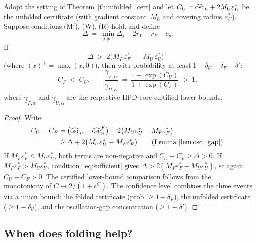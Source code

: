 \begin{theorem}\label{thm:gap_improvement}
  Adopt the setting of Theorem~\ref{thm:folded_cert} and let
  $C_U = \widehat{\mathrm{osc}}_n + 2 M_U \varepsilon_U^*$ be the unfolded
  certificate (with gradient constant~$M_U$ and covering
  radius~$\varepsilon_U^*$).
  Suppose conditions \textup{(M$'$)}, \textup{(W)}, \textup{(R)}
  hold, and define
  \[
    \Delta
    \;=\;
    \min_{j \neq 1}\Delta_j - 2r_1 - r_F - c_n.
  \]
  If
  \begin{equation}\label{eq:sufficient}
    \Delta
    \;>\;
    2\bigl(M_F\,\varepsilon_F^*
    \;-\; M_U\,\varepsilon_U^*\bigr)^{\!+}
  \end{equation}
  (where $(x)^+ = \max(x,0)$), then with probability at least
  $1 - \delta_U - \delta_F - \delta'$:
  \begin{equation}\label{eq:C_comparison}
    C_F \;<\; C_U,
    \qquad
    \frac{\underline{\gamma}_{F,\alpha}}{\underline{\gamma}_{U,\alpha}}
    \;=\;
    \frac{1 + \exp(C_U)}{1 + \exp(C_F)}
    \;>\; 1,
  \end{equation}
  where $\underline{\gamma}_{F,\alpha}$ and
  $\underline{\gamma}_{U,\alpha}$ are the respective HPD-core
  certified lower bounds.
\end{theorem}

\begin{proof}
  Write
  \begin{align*}
    C_U - C_F
    &= \bigl(\widehat{\mathrm{osc}}_n - \widehat{\mathrm{osc}}_n^F\bigr)
       + 2\bigl(M_U\varepsilon_U^* - M_F\varepsilon_F^*\bigr) \\
    &\geq \Delta + 2\bigl(M_U\varepsilon_U^* - M_F\varepsilon_F^*\bigr)
      \qquad\text{(Lemma~\ref{lem:osc_gap})}.
  \end{align*}
  If $M_F\varepsilon_F^* \leq M_U\varepsilon_U^*$, both terms are
  non-negative and $C_U - C_F \geq \Delta > 0$.
  If $M_F\varepsilon_F^* > M_U\varepsilon_U^*$,
  condition~\eqref{eq:sufficient} gives
  $\Delta > 2(M_F\varepsilon_F^* - M_U\varepsilon_U^*)$, so again
  $C_U - C_F > 0$.  The certified lower-bound comparison follows
  from the monotonicity of $C \mapsto 2/(1 + e^C)$.
  The confidence level combines the three events via a union bound:
  the folded certificate (prob $\geq 1 - \delta_F$), the unfolded
  certificate ($\geq 1 - \delta_U$), and the oscillation-gap
  concentration ($\geq 1 - \delta'$).
\end{proof}


\subsection{When does folding help?}
\label{sec:when_folding_helps}

